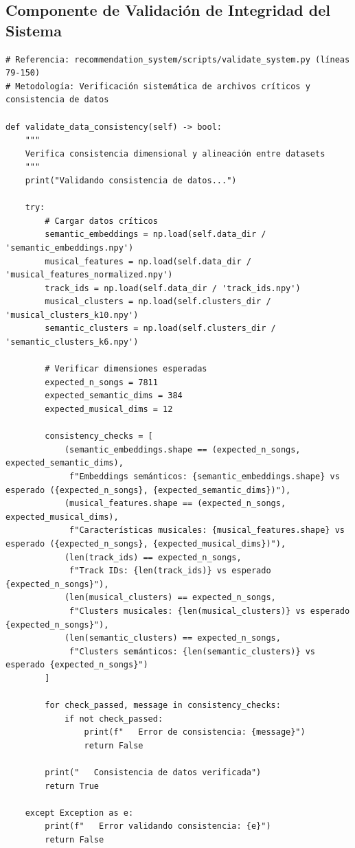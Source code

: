 \documentclass[12pt,a4paper]{report}
\begin{document}
\subsection{Componente de Validación de Integridad del Sistema}

\begin{lstlisting}[caption={Verificación Sistemática de Consistencia de Datos}]
# Referencia: recommendation_system/scripts/validate_system.py (líneas 79-150)
# Metodología: Verificación sistemática de archivos críticos y consistencia de datos

def validate_data_consistency(self) -> bool:
    """
    Verifica consistencia dimensional y alineación entre datasets
    """
    print("Validando consistencia de datos...")

    try:
        # Cargar datos críticos
        semantic_embeddings = np.load(self.data_dir / 'semantic_embeddings.npy')
        musical_features = np.load(self.data_dir / 'musical_features_normalized.npy')
        track_ids = np.load(self.data_dir / 'track_ids.npy')
        musical_clusters = np.load(self.clusters_dir / 'musical_clusters_k10.npy')
        semantic_clusters = np.load(self.clusters_dir / 'semantic_clusters_k6.npy')

        # Verificar dimensiones esperadas
        expected_n_songs = 7811
        expected_semantic_dims = 384
        expected_musical_dims = 12

        consistency_checks = [
            (semantic_embeddings.shape == (expected_n_songs, expected_semantic_dims),
             f"Embeddings semánticos: {semantic_embeddings.shape} vs esperado ({expected_n_songs}, {expected_semantic_dims})"),
            (musical_features.shape == (expected_n_songs, expected_musical_dims),
             f"Características musicales: {musical_features.shape} vs esperado ({expected_n_songs}, {expected_musical_dims})"),
            (len(track_ids) == expected_n_songs,
             f"Track IDs: {len(track_ids)} vs esperado {expected_n_songs}"),
            (len(musical_clusters) == expected_n_songs,
             f"Clusters musicales: {len(musical_clusters)} vs esperado {expected_n_songs}"),
            (len(semantic_clusters) == expected_n_songs,
             f"Clusters semánticos: {len(semantic_clusters)} vs esperado {expected_n_songs}")
        ]

        for check_passed, message in consistency_checks:
            if not check_passed:
                print(f"   Error de consistencia: {message}")
                return False

        print("   Consistencia de datos verificada")
        return True

    except Exception as e:
        print(f"   Error validando consistencia: {e}")
        return False
\end{lstlisting}
\end{document}
